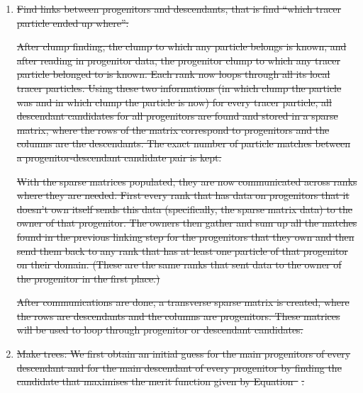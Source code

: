 \documentclass[a4paper,twocolumn,fleqn,usenatbib]{mnras}
\providecommand{\DIFdel}[1]{{\protect\color{red}\sout{#1}}}                      %
\begin{document}
\begin{enumerate}
\item %
\DIFdel{Find links between progenitors and descendants, that is find ``which tracer particle ended up where'':
	}%

\DIFdel{After clump finding, the clump to which any particle belongs is known, and after reading in progenitor data, the progenitor clump 
		to which any tracer particle belonged to is known.
		Each rank now loops through all its local tracer particles.
		Using these two informations (in which clump the particle was and in which clump the particle is now) for every tracer particle, 
		all descendant candidates for all progenitors are found and stored in a sparse matrix, where the rows of the matrix correspond 
		to progenitors and the columns are the descendants.
		The exact number of particle matches between a progenitor-descendant candidate pair is kept.
		}%

\DIFdel{With the sparse matrices populated, they are now communicated across ranks where they are needed. 
		First every rank that has data on progenitors that it doesn't own itself sends this data (specifically, the sparse matrix data) to the owner of that progenitor.
		The owners then gather and sum up all the matches found in the previous linking step for the progenitors that they own and then send them 
		back to any rank that has at least one particle of that progenitor on their domain.
		(These are the same ranks that sent data to the owner of the progenitor in the first place.)
		}%

\DIFdel{After communications are done, a transverse sparse matrix is created, where the rows are descendants and the columns are progenitors.
		These matrices will be used to loop through progenitor or descendant candidates.
		}%

\item %
\DIFdel{Make trees:
		We first obtain an initial guess for the main progenitors of every descendant and for the main descendant of every progenitor by
		finding the candidate that maximises the merit function given by Equation~}%
\DIFdel{.
		}%


\end{enumerate}
\end{document}
